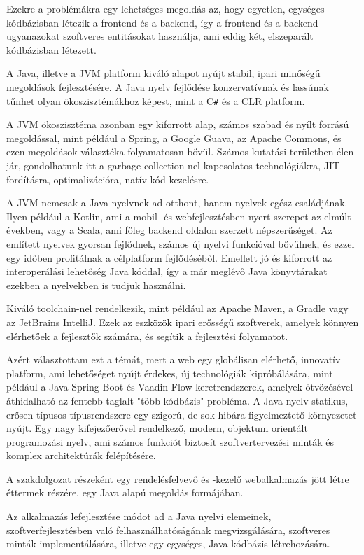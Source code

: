 Ezekre a problémákra egy lehetséges megoldás az, hogy egyetlen, egységes kódbázisban létezik a frontend és a backend, így a frontend és a backend ugyanazokat szoftveres entitásokat használja, ami eddig két, elszeparált kódbázisban létezett.\par

A Java, illetve a JVM platform kiváló alapot nyújt stabil, ipari minőségű megoldások fejlesztésére. A Java nyelv fejlődése konzervatívnak és lassúnak tűnhet olyan ökoszisztémákhoz képest, mint a C\verb|#| és a CLR platform. \par

A JVM ökoszisztéma azonban egy kiforrott alap, számos szabad és nyílt forrású megoldással, mint például a Spring, a Google Guava, az Apache Commons, és ezen megoldások választéka folyamatosan bővül. Számos kutatási területben élen jár, gondolhatunk itt a garbage collection-nel kapcsolatos technológiákra, JIT fordításra, optimalizációra, natív kód kezelésre.
\par

A JVM nemcsak a Java nyelvnek ad otthont, hanem nyelvek egész családjának. Ilyen például a Kotlin, ami a mobil- és webfejlesztésben nyert szerepet az elmúlt években, vagy a Scala, ami főleg backend oldalon szerzett népszerűséget. Az említett nyelvek gyorsan fejlődnek, számos új nyelvi funkcióval bővülnek, és ezzel egy időben profitálnak a célplatform fejlődéséből. Emellett jó és kiforrott az interoperálási lehetőség Java kóddal, így a már meglévő Java könyvtárakat ezekben a nyelvekben is tudjuk használni. \par

Kiváló toolchain-nel rendelkezik, mint például az Apache Maven, a Gradle vagy az JetBrains IntelliJ. Ezek az eszközök ipari erősségű szoftverek, amelyek könnyen elérhetőek a fejlesztők számára, és segítik a fejlesztési folyamatot. \par

Azért választottam ezt a témát, mert a web egy globálisan elérhető, innovatív platform, ami lehetőséget nyújt érdekes, új technológiák kipróbálására, mint például a Java Spring Boot és Vaadin Flow keretrendszerek, amelyek ötvözésével áthidalható az fentebb taglalt "több kódbázis" probléma. A Java nyelv statikus, erősen típusos típusrendszere egy szigorú, de sok hibára figyelmeztető környezetet nyújt. Egy nagy kifejezőerővel rendelkező, modern, objektum orientált programozási nyelv, ami számos funkciót biztosít szoftvertervezési minták és komplex architektúrák felépítésére. \par

A szakdolgozat részeként egy rendelésfelvevő és -kezelő webalkalmazás jött létre éttermek részére, egy Java alapú megoldás formájában. \par

Az alkalmazás lefejlesztése módot ad a Java nyelvi elemeinek, szoftverfejlesztésben való felhasználhatóságának megvizsgálására, szoftveres minták implementálására, illetve egy egységes, Java kódbázis létrehozására. \par